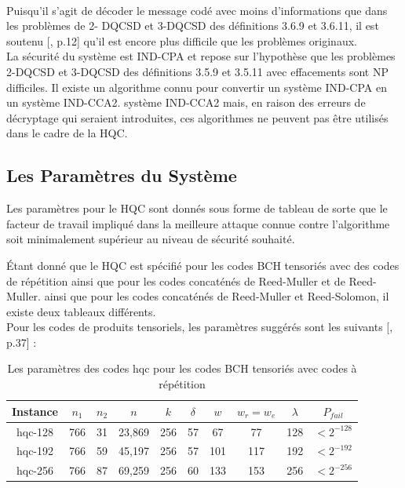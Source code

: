 \documentclass[12pt,openany]{report}
\begin{document}
\paragraph{}
Puisqu'il s'agit de décoder le message codé avec moins d'informations que dans les problèmes de 2-
DQCSD et 3-DQCSD des définitions 3.6.9 et 3.6.11, il est soutenu [\cite{melchor2020}, p.12] qu'il est encore plus difficile que les problèmes originaux.\\
La sécurité du système est IND-CPA et repose sur l'hypothèse que les problèmes 2-DQCSD et 3-DQCSD des définitions 3.5.9 et 3.5.11 avec effacements sont NP difficiles. Il existe un algorithme connu pour convertir un système IND-CPA en un système IND-CCA2.
système IND-CCA2 mais, en raison des erreurs de décryptage qui seraient introduites, ces algorithmes ne peuvent pas être utilisés dans le cadre de la HQC.
\subsection{Les Paramètres du Système}

Les paramètres pour le HQC sont donnés sous forme de tableau de sorte que le facteur de travail impliqué dans la meilleure attaque connue contre l'algorithme soit minimalement supérieur au niveau de sécurité souhaité.

Étant donné que le HQC est spécifié pour les codes BCH tensoriés avec des codes de répétition ainsi que pour les codes concaténés de Reed-Muller et de Reed-Muller.
ainsi que pour les codes concaténés de Reed-Muller et Reed-Solomon, il existe deux tableaux différents.\\
Pour les codes de produits tensoriels, les paramètres suggérés sont les suivants [\cite{melchor2020}, p.37] :


\begin{table}
\centering

\begin{tabular}{|c||c|c|c|c|c|c|c|c|c| }
\hline
 Instance & $n_1$ & $ n_2$&$n$&$k$&$\delta$&$w$&$ w_r=w_e$&$\lambda$&$P_{fail}$\\ 
 \hline
hqc-128&766&31&23,869&256&57&67&77&128&$<2^{-128} $\\
\hline
hqc-192&766&59&45,197&256&57&101&117&192&$<2^{-192} $\\
\hline
hqc-256&766&87& 69,259&256&60&133&153&256&$<2^{-256} $\\
\hline
\end{tabular}
\caption{Les paramètres des codes hqc pour les codes BCH tensoriés avec codes à répétition}
\label{hqc_2}
\end{table}
\end{document}

